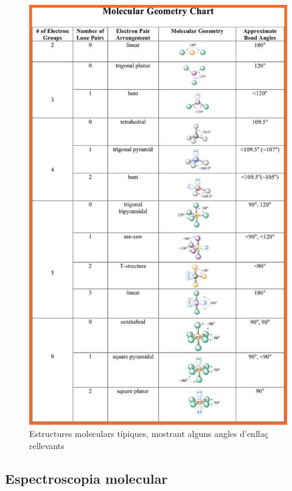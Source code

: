 \begin{figure}[h]
\centering
\includegraphics[scale=0.5]{figures/molecular-geometry.png}
\caption{Estructures moleculars típiques, mostrant alguns angles d'enllaç rellevants}
\label{fig:molecular-geometry}
\end{figure}

\subsection{Espectroscopia molecular}

